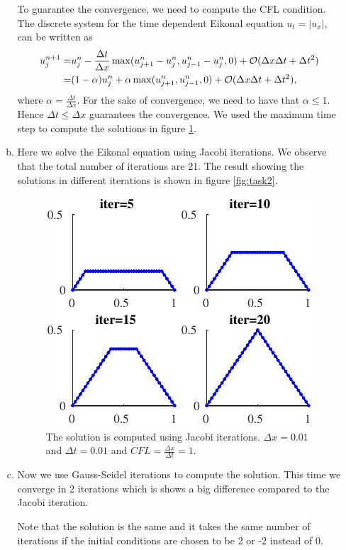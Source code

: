 \documentclass[10pt,a4paper,twoside, french]{article}
\numberwithin{equation}{section}
\numberwithin{figure}{section}
\numberwithin{table}{section}
\begin{document}
\begin{enumerate}
\begin{enumerate}[a.]
To guarantee the convergence, we need to compute the CFL condition. The discrete system for the time dependent Eikonal equation $u_t=|u_x|$, can be written as
\begin{align*}
u_j^{n+1}=&u_j^n-\frac{\Delta t}{\Delta x} \max(u_{j+1}^n-u_j^n,u_{j-1}^n-u_j^n,0)+{\cal O}(\Delta x\Delta t+\Delta t^2) \\
=&(1-\alpha)u_j^n+\alpha\max(u_{j+1}^n,u_{j-1}^n,0)+{\cal O}(\Delta x\Delta t+\Delta t^2),
\end{align*}
where $\alpha=\frac{\Delta t}{\Delta x}$. For the sake of convergence, we need to have that $\alpha\leq 1$. Hence $\Delta t\leq  \Delta x$ guarantees the convergence. We used the maximum time step to compute the solutions in figure \ref{fig:task1}.

\item Here we solve the Eikonal equation using Jacobi iterations. We observe that the total number of iterations are 21. The result showing the solutions in different iterations is shown in figure \ref{fig:task2}.
\begin{figure}[h]
\centering
\includegraphics[scale=1.5]{fig/Task2}
\caption{The solution is computed using Jacobi iterations. $\Delta x=0.01$ and $\Delta t=0.01$ and $CFL=\frac{\Delta x}{\Delta t}=1$.}
\label{fig:task1}
\end{figure}

\item Now we use Gauss-Seidel iterations to compute the solution. This time we converge in 2 iterations which is shows a big difference compared to the Jacobi iteration.

Note that the solution is the same and it takes the same number of iterations if the initial conditions are chosen to be 2 or -2 instead of 0. 


\end{enumerate}
\end{enumerate}
\end{document}
